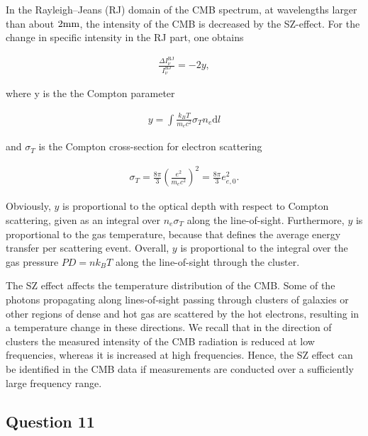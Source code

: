 \documentclass[a4paper,11pt]{article}
\begin{document}
{\noindent}In the Rayleigh–Jeans (RJ) domain of the CMB spectrum, at wavelengths larger than about $2{\rm mm}$, the intensity of the CMB is decreased by the SZ-effect. For the change in specific intensity in the RJ part, one obtains

\begin{align*}
    \frac{\Delta I_\nu^\mathrm{RJ}}{I_\nu^\mathrm{RJ}} = -2y,
\end{align*}

{\noindent}where y is the the Compton parameter

\begin{align*}
    y = \int\frac{k_BT}{m_ec^2}\sigma_Tn_e\mathrm{d}l
\end{align*}

{\noindent}and $\sigma_T$ is the Compton cross-section for electron scattering

\begin{align*}
    \sigma_T = \frac{8\pi}{3}\left(\frac{e^2}{m_ec^2}\right)^2 = \frac{8\pi}{3}e_{e,0}^2.
\end{align*}

{\noindent}Obviously, $y$ is proportional to the optical depth with respect to Compton scattering, given as an integral over $n_e\sigma_T$ along the line-of-sight. Furthermore, $y$ is proportional to the gas temperature, because that defines the average energy transfer per scattering event. Overall, $y$ is proportional to the integral over the gas pressure $P D=nk_BT$ along the line-of-sight through the cluster.

{\noindent}The SZ effect affects the temperature distribution of the CMB. Some of the photons propagating along lines-of-sight passing through clusters of galaxies or other regions of dense and hot gas are scattered by the hot electrons, resulting in a temperature change in these directions. We recall that in the direction of clusters the measured intensity of the CMB radiation is reduced at low frequencies, whereas it is increased at high frequencies. Hence, the SZ effect can be identified in the CMB data if measurements are conducted over a sufficiently large frequency range.


%
%

\newpage
\subsection{Question 11}
\end{document}
